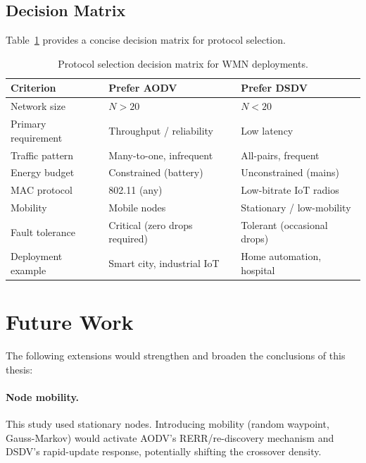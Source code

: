 \subsection{Decision Matrix}

Table~\ref{tab:decision_matrix} provides a concise decision matrix for protocol selection.

\begin{table}[ht]
\centering
\caption{Protocol selection decision matrix for WMN deployments.}
\label{tab:decision_matrix}
\begin{tabular}{@{}lll@{}}
\toprule
\textbf{Criterion} & \textbf{Prefer AODV} & \textbf{Prefer DSDV} \\
\midrule
Network size         & $N > 20$                      & $N < 20$ \\
Primary requirement  & Throughput / reliability      & Low latency \\
Traffic pattern      & Many-to-one, infrequent       & All-pairs, frequent \\
Energy budget        & Constrained (battery)         & Unconstrained (mains) \\
MAC protocol         & 802.11 (any)                  & Low-bitrate IoT radios \\
Mobility             & Mobile nodes                  & Stationary / low-mobility \\
Fault tolerance      & Critical (zero drops required)& Tolerant (occasional drops) \\
Deployment example   & Smart city, industrial IoT    & Home automation, hospital \\
\bottomrule
\end{tabular}
\end{table}

\section{Future Work}

The following extensions would strengthen and broaden the conclusions of this thesis:

\paragraph{Node mobility.}
This study used stationary nodes. Introducing mobility (random waypoint, Gauss-Markov)
would activate AODV's RERR/re-discovery mechanism and DSDV's rapid-update response,
potentially shifting the crossover density.

